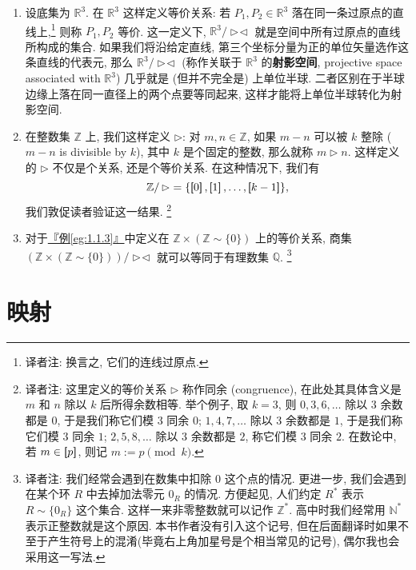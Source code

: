 \documentclass[lang=cn,zihao=-4,twoside,fontset=none]{textbook}
\newcommand{\equivclass}[1]{\left[\hspace{-3pt}\left[#1\right]\hspace{-2.5pt}\right]}
\newcommand{\egref}[1]{\hyperref[#1]{『例\textnormal{\ref*{#1}}』}}
\begin{document}
\begin{exam}
    \begin{enumerate}[label=\textnormal{(\alph*)}]
        \item 设底集为 $\mathbb R^3$. 在 $\mathbb R^3$ 这样定义等价关系: 若 $P_1,P_2\in\mathbb R^3$ 落在同一条过原点的直线上,\footnote{译者注: 换言之, 它们的连线过原点.} 则称 $P_1,P_2$ 等价. 这一定义下, $\mathbb R^3/\mathop{\triangleright\!\triangleleft}$ 就是空间中所有过原点的直线所构成的集合.  如果我们将沿给定直线, 第三个坐标分量为正的单位矢量选作这条直线的代表元, 那么 $\mathbb R^3/\mathop{\triangleright\!\triangleleft}$ (称作关联于 $\mathbb R^3$ 的\textbf{射影空间}, projective space associated with $\mathbb R^3$) 几乎就是 (但并不完全是) 上单位半球. 二者区别在于半球边缘上落在同一直径上的两个点要等同起来, 这样才能将上单位半球转化为射影空间.
        \item 在整数集 $\mathbb Z$ 上, 我们这样定义 $\rhd$: 对 $m,n\in\mathbb Z$, 如果 $m-n$ 可以被 $k$ 整除 ($m-n$ is divisible by $k$), 其中 $k$ 是个固定的整数, 那么就称 $m\rhd n$. 这样定义的 $\rhd$ 不仅是个关系, 还是个等价关系. 在这种情况下, 我们有
        $$
        \mathbb Z/\mathop{\rhd}=\{\equivclass{0},\equivclass{1},\dots,\equivclass{k-1}\},
        $$
        我们敦促读者验证这一结果. \footnote{译者注: 这里定义的等价关系 $\rhd$ 称作同余 (congruence), 在此处其具体含义是 $m$ 和 $n$ 除以 $k$ 后所得余数相等. 举个例子, 取 $k=3$, 则 $0,3,6,\dots$ 除以 $3$ 余数都是 $0$, 于是我们称它们模 $3$ 同余 $0$; $1,4,7,\dots$ 除以 $3$ 余数都是 $1$, 于是我们称它们模 $3$ 同余 $1$; $2,5,8,\dots$ 除以 $3$ 余数都是 $2$, 称它们模 $3$ 同余 $2$. 在数论中, 若 $m\in[\hspace{-2.5pt}[{p}]\hspace{-2.2pt}]$, 则记 $m:= p\pmod k$.}
        \item 对于\egref{eg:1.1.3}中定义在 $\mathbb Z\times(\mathbb Z\sim\{0\})$ 上的等价关系, 商集 $(\mathbb Z\times(\mathbb Z\sim\{0\}))/\mathop{\triangleright\!\triangleleft}$ 就可以等同于有理数集 $\mathbb Q$. \footnote{译者注: 我们经常会遇到在数集中扣除 $0$ 这个点的情况. 更进一步, 我们会遇到在某个环 $R$ 中去掉加法零元 $0_R$ 的情况. 方便起见, 人们约定 $R^*$ 表示 $R\sim\{0_R\}$ 这个集合. 这样一来非零整数就可以记作 $\mathbb Z^*$. 高中时我们经常用 $\mathbb N^*$ 表示正整数就是这个原因. 本书作者没有引入这个记号, 但在后面翻译时如果不至于产生符号上的混淆(毕竟右上角加星号是个相当常见的记号), 偶尔我也会采用这一写法.}
    \end{enumerate}
\end{exam}

\newpage
\section{映射}\label{sec:1.2}
\end{document}
